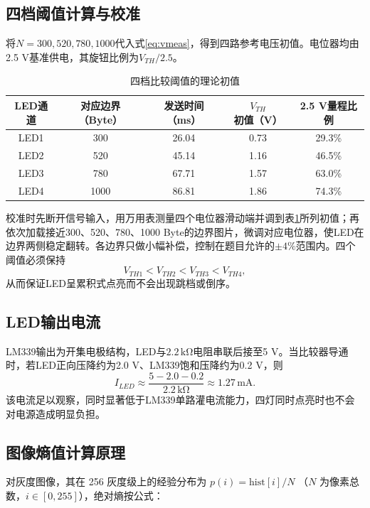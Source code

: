 \documentclass[a4paper]{article}
\newcommand{\unit}[1]{\ensuremath{\,\mathrm{#1}}}
\begin{document}
\subsection{四档阈值计算与校准}
将$N=300,520,780,1000$代入式\eqref{eq:vmeas}，得到四路参考电压初值。电位器均由2.5 V基准供电，其旋钮比例为$V_{TH}/2.5$。

\begin{table}[H]
\centering
\caption{四档比较阈值的理论初值}
\label{tab:vthreshold}
\begin{tabular}{ccccc}
\toprule
LED通道 & 对应边界（Byte） & 发送时间（ms） & $V_{TH}$初值（V） & 2.5 V量程比例 \\
\midrule
LED1 & 300  & 26.04 & 0.73 & 29.3\%\\
LED2 & 520  & 45.14 & 1.16 & 46.5\%\\
LED3 & 780  & 67.71 & 1.57 & 63.0\%\\
LED4 & 1000 & 86.81 & 1.86 & 74.3\%\\
\bottomrule
\end{tabular}
\end{table}

校准时先断开信号输入，用万用表测量四个电位器滑动端并调到表\ref{tab:vthreshold}所列初值；再依次加载接近300、520、780、1000 Byte的边界图片，微调对应电位器，使LED在边界两侧稳定翻转。各边界只做小幅补偿，控制在题目允许的$\pm4\%$范围内。四个阈值必须保持
\begin{equation}
V_{TH1}<V_{TH2}<V_{TH3}<V_{TH4},
\end{equation}
从而保证LED呈累积式点亮而不会出现跳档或倒序。

\subsection{LED输出电流}
LM339输出为开集电极结构，LED与$2.2\unit{k\Omega}$电阻串联后接至5 V。当比较器导通时，若LED正向压降约为2.0 V、LM339饱和压降约为0.2 V，则
\begin{equation}
I_{LED}\approx\frac{5-2.0-0.2}{2.2\unit{k\Omega}}\approx1.27\unit{mA}.
\end{equation}
该电流足以观察，同时显著低于LM339单路灌电流能力，四灯同时点亮时也不会对电源造成明显负担。


\subsection{图像熵值计算原理}

对灰度图像，其在 256 灰度级上的经验分布为 $p(i) = \mathrm{hist}[i]/N$
（$N$ 为像素总数，$i \in [0, 255]$），绝对熵按公式：
\end{document}
